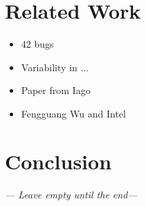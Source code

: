 \documentclass[a4paper,11pt]{article}
\begin{document}
\newpage
\section{Related Work}

\begin{itemize}
    \item 42 bugs
    \item Variability in ...
    \item Paper from Iago
    \item Fengguang Wu and Intel
\end{itemize}



\newpage
\section{Conclusion}
\emph{--- Leave empty until the end---}




\newpage

\end{document}
